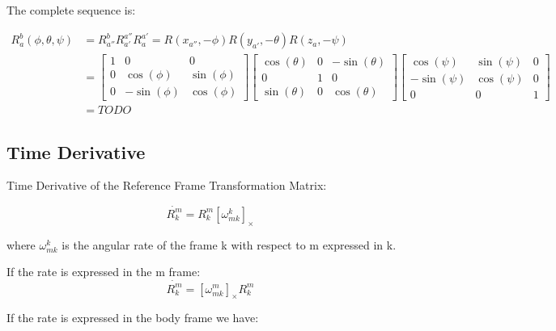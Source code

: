 \documentclass[a4paper]{paper}
\begin{document}
The complete sequence is:

\begin{equation}
\begin{aligned}
    R_{a}^{b}(\phi, \theta, \psi) &= R_{a''}^{b} R_{a'}^{a''}  R_a^{a'} 
    = R(x_{a''}, -\phi)R(y_{a'}, -\theta)R(z_a, -\psi) \\
    &=
    \left[\begin{matrix}1 & 0 & 0\\
    0 & \cos{\left (\phi \right )} & \sin{\left (\phi \right )}\\
    0 & - \sin{\left (\phi \right )} & \cos{\left (\phi \right )}\end{matrix}\right]
    \left[\begin{matrix}\cos{\left (\theta \right )} & 0 & - \sin{\left (\theta \right )}\\
    0 & 1 & 0\\
    \sin{\left (\theta \right )} & 0 & \cos{\left (\theta \right )}\end{matrix}\right]
    \left[\begin{matrix}\cos{\left (\psi \right )} & \sin{\left (\psi \right )} & 0\\
    - \sin{\left (\psi \right )} & \cos{\left (\psi \right )} & 0\\
    0 & 0 & 1\end{matrix}\right] \\
    &= TODO
\end{aligned}
\end{equation}


\subsection{Time Derivative}

Time Derivative of the Reference Frame Transformation Matrix:

\begin{equation}
    \dot{R_k^m} = R_k^m [\omega^k_{mk}]_{\times}
\end{equation}

where $\omega^k_{mk}$ is the angular rate of the frame k with respect to m expressed in k.

If the rate is expressed in the m frame:
\begin{equation}
    \dot{R_k^m} = [\omega^m_{mk}]_{\times} R_k^m
\end{equation}



If the rate is expressed in the body frame we have:
\end{document}
